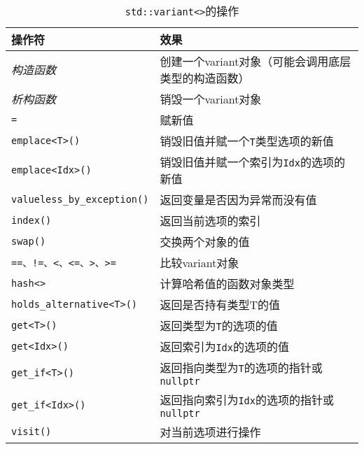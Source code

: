 \begin{table}[htb]
    \centering
    \begin{tabular}{l|l}
        \hline
        \textbf{操作符}                        & \textbf{效果}                                \\
        \hline
        \emph{构造函数}                         & 创建一个variant对象（可能会调用底层类型的构造函数）              \\
        \emph{析构函数}                         & 销毁一个variant对象                              \\
        \texttt{=}                          & 赋新值                                        \\
        \texttt{emplace<T>()}               & 销毁旧值并赋一个\texttt{T}类型选项的新值                  \\
        \texttt{emplace<Idx>()}             & 销毁旧值并赋一个索引为\texttt{Idx}的选项的新值              \\
        \texttt{valueless\_by\_exception()} & 返回变量是否因为异常而没有值                             \\
        \texttt{index()}                    & 返回当前选项的索引                                  \\
        \texttt{swap()}                     & 交换两个对象的值                                   \\
        \texttt{==、!=、<、<=、>、>=}            & 比较variant对象                                \\
        \texttt{hash<>}                     & 计算哈希值的函数对象类型                               \\
        \texttt{holds\_alternative<T>()}    & 返回是否持有类型T的值                                \\
        \texttt{get<T>()}                   & 返回类型为\texttt{T}的选项的值                       \\
        \texttt{get<Idx>()}                 & 返回索引为\texttt{Idx}的选项的值                     \\
        \texttt{get\_if<T>()}               & 返回指向类型为\texttt{T}的选项的指针或\texttt{nullptr}   \\
        \texttt{get\_if<Idx>()}             & 返回指向索引为\texttt{Idx}的选项的指针或\texttt{nullptr} \\
        \texttt{visit()}                    & 对当前选项进行操作                                  \\
        \hline
    \end{tabular}
    \caption{\texttt{std::variant<>}的操作}
    \label{t16.1}
\end{table}

